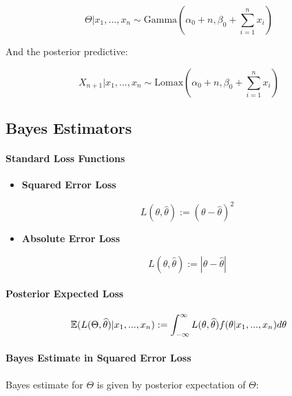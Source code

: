 \documentclass[a4paper]{article}
\begin{document}
                \[
                    \Theta | x_1, ..., x_n \sim \text{Gamma}\left(\alpha_0 + n,
                    \beta_0 + \sum_{i=1}^n x_i\right)
                \]

                And the posterior predictive:

                \[
                    X_{n+1} | x_1, ..., x_n \sim \text{Lomax}\left(\alpha_0 + n,
                    \beta_0 + \sum_{i=1}^n x_i\right)
                \]

        \subsection*{Bayes Estimators}
            \paragraph{Standard Loss Functions}
                \begin{itemize}
                    \item \textbf{Squared Error Loss}

                        \[
                            L(\theta, \widehat \theta) := (\theta - \widehat
                            \theta)^2
                        \]
                    \item \textbf{Absolute Error Loss}

                        \[
                            L(\theta, \widehat \theta) := |\theta - \widehat
                            \theta|
                        \]
                \end{itemize}

            \paragraph{Posterior Expected Loss}
                \[
                    \mathbb{E}(L(\Theta, \widehat \theta) | x_1, ..., x_n) :=
                    \int_{-\infty}^\infty L(\theta, \widehat \theta) f(\theta |
                    x_1, ..., x_n) d\theta
                \]

            \paragraph{Bayes Estimate in Squared Error Loss}
                Bayes estimate for $\Theta$ is given by posterior expectation of
                $\Theta$:
\end{document}
